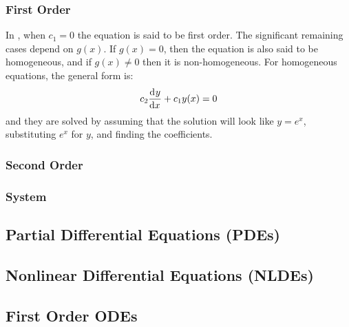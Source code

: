     \subsubsection{First Order}
        In , when $c_1=0$ the equation is said to be first order. The significant remaining cases depend on $g(x)$. If $g(x)=0$, then the equation is also said to be homogeneous, and if $g(x)\neq0$ then it is non-homogeneous. For homogeneous equations, the general form is:
        \begin{equation}
            c_2\der{y}{x}+c_1y(x)=0
        \end{equation}
        and they are solved by assuming that the solution will look like $y=e^{x}$, substituting $e^{x}$ for $y$, and finding the coefficients. 
    \subsubsection{Second Order}
    \subsubsection{System} 
\subsection{Partial Differential Equations (PDEs)}
\subsection{Nonlinear Differential Equations (NLDEs)}
\subsection{First Order ODEs}
